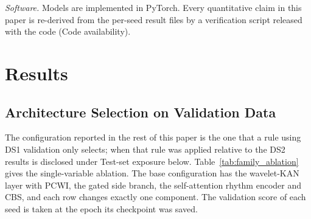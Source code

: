\documentclass[preprint,12pt]{elsarticle}
\begin{document}
\emph{Software.} Models are implemented in PyTorch. Every quantitative claim in this paper is re-derived from the per-seed result files by a verification script released with the code (Code availability).

\section{Results}
\label{sec:results}

\subsection{Architecture Selection on Validation Data}
\label{sec:results_selection}
The configuration reported in the rest of this paper is the one that a rule using DS1 validation only selects; when that rule was applied relative to the DS2 results is disclosed under Test-set exposure below. Table~\ref{tab:family_ablation} gives the single-variable ablation. The base configuration has the wavelet-KAN layer with PCWI, the gated side branch, the self-attention rhythm encoder and CBS, and each row changes exactly one component. The validation score of each seed is taken at the epoch its checkpoint was saved.
\end{document}
